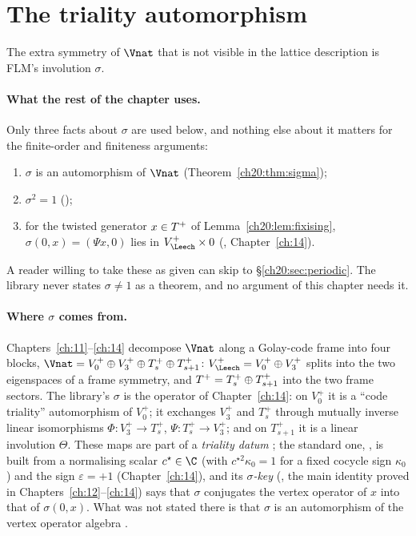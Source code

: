 \section{The triality automorphism}\label{ch20:sec:sigma}

The extra symmetry of $\Vnat$ that is not visible in the lattice description is FLM's involution $\sigma$.

\paragraph{What the rest of the chapter uses.}  Only three facts about $\sigma$ are used below, and nothing else about it
matters for the finite-order and finiteness arguments:
\begin{enumerate}[label=($\sigma$\arabic*)]
\item $\sigma$ is an automorphism of $\Vnat$ (Theorem~\ref{ch20:thm:sigma});
\item $\sigma^2=1$ ();
\item for the twisted generator $x\in T^{+}$ of Lemma~\ref{ch20:lem:fixising}, $\sigma(0,x)=(\Psi x,0)$ lies in
  $\chtwentyVL\times0$ (, Chapter~\ref{ch:14}).
\end{enumerate}
A reader willing to take these as given can skip to \S\ref{ch20:sec:periodic}.  The library never states $\sigma\neq1$ as a
theorem, and no argument of this chapter needs it.

\paragraph{Where $\sigma$ comes from.}  Chapters~\ref{ch:11}--\ref{ch:14} decompose $\Vnat$ along a Golay-code frame into
four blocks, $\Vnat=V_0^+\oplus V_3^+\oplus T_s^+\oplus T_{s+1}^+$: $\chtwentyVL=V_0^+\oplus V_3^+$ splits into the two
eigenspaces of a frame symmetry, and $T^{+}=T_s^+\oplus T_{s+1}^+$ into the two frame sectors.  The library's
$\sigma$ is the operator  of Chapter~\ref{ch:14}: on $V_0^+$ it is a ``code triality'' automorphism of $V_0^+$;
it exchanges $V_3^+$ and $T_s^+$ through mutually inverse linear isomorphisms $\Phi:V_3^+\to T_s^+$, $\Psi:T_s^+\to V_3^+$;
and on $T_{s+1}^+$ it is a linear involution $\Theta$.  These maps are part of a \emph{triality datum} ; the
standard one, , is built from a normalising scalar $c^\star\in\C$ (with $c^{\star2}\kappa_0=1$ for a fixed
cocycle sign $\kappa_0$) and the sign $\varepsilon=+1$ (Chapter~\ref{ch:14}), and its
\emph{$\sigma$-key} (, the main identity proved in Chapters~\ref{ch:12}--\ref{ch:14}) says that
$\sigma$ conjugates the vertex operator of $x$ into that of $\sigma(0,x)$.  What was not stated there is that $\sigma$ is an
automorphism of the vertex operator algebra .


